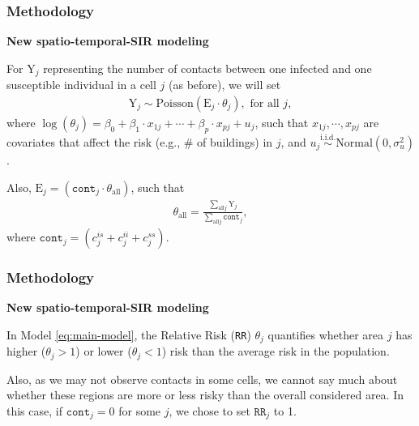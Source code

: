 \documentclass[12pt, aspectratio = 169]{beamer} %
\begin{document}
	\begin{frame}[t]
		\frametitle{Methodology}
		\justifying
		\textcolor{titles}{\textbf{New spatio-temporal-SIR modeling}}
		
		For $\text{Y}_j$ representing the number of contacts between one infected and one susceptible individual in a cell $j$ (as before), we will set 
		\begin{align}\label{eq:main-model}
			\text{Y}_j \sim \text{Poisson}(\text{E}_j\cdot\theta_j), \text{~for all~} j,
		\end{align}
		where $\log(\theta_j) = \beta_0 + \beta_1 \cdot x_{1j} + \cdots +  \beta_p \cdot x_{pj} + u_j$, such that $x_{1j}, \cdots, x_{pj}$ are covariates that affect the risk (e.g., \# of buildings) in $j$, and $u_j \overset{\text{i.i.d.}}{\sim} \text{Normal}(0, \sigma^2_{u})$. 
		
		Also, $\text{E}_j = (\texttt{cont}_j \cdot \theta_{\text{all}})$, such that
		\begin{align*}
			\theta_{\text{all}} = \frac{\sum_{\text{all} j}\text{Y}_j}{\sum_{\text{all} j}\texttt{cont}_j},
		\end{align*}
		where $\texttt{cont}_j = (c^{is}_{j} + c^{ii}_{j} + c^{ss}_{j})$.
		
		
	\end{frame}

	\begin{frame}[t]
		\frametitle{Methodology}
		\justifying
		\textcolor{titles}{\textbf{New spatio-temporal-SIR modeling}}
		
		In Model \eqref{eq:main-model}, the Relative Risk (\texttt{RR}) $\theta_j$ quantifies whether area $j$ has higher ($\theta_j > 1$) or lower ($\theta_j  < 1$) risk than the average risk in the population.
		
		\pause
		
		Also, as we may not observe contacts in some cells, we cannot say much about whether these regions are more or less risky than the overall considered area. In this case, if $\texttt{cont}_j = 0$ for some $j$, we chose to set $\texttt{RR}_j$ to 1.
	\end{frame}
\end{document}
